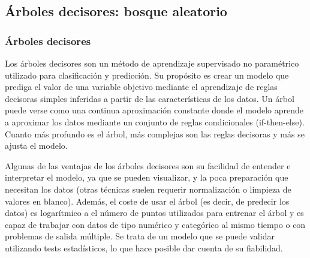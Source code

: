 




\subsection{Árboles decisores: bosque aleatorio}
\subsubsection{Árboles decisores}


Los árboles decisores son un método de aprendizaje supervisado no paramétrico utilizado para clasificación y predicción.
Su propósito es crear un modelo que prediga el valor de una variable objetivo mediante el aprendizaje de reglas decisoras simples inferidas a partir de las características de los datos.
Un árbol puede verse como una continua aproximación constante donde el modelo aprende a aproximar los datos mediante un conjunto de reglas condicionales (if-then-else).
Cuanto más profundo es el árbol, más complejas son las reglas decisoras y más se ajusta el modelo.

Algunas de las ventajas de los árboles decisores son su facilidad de entender e interpretar el modelo, ya que se pueden visualizar, y la poca preparación que necesitan los datos (otras técnicas suelen requerir normalización o limpieza de valores en blanco).
Además, el coste de usar el árbol (es decir, de predecir los datos) es logarítmico a el número de puntos utilizados para entrenar el árbol y es capaz de trabajar con datos de tipo numérico y categórico al mismo tiempo o con problemas de salida múltiple.
Se trata de un modelo que se puede validar utilizando tests estadísticos,
lo que hace posible dar cuenta de su fiabilidad.

